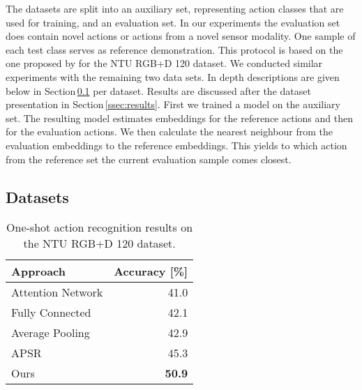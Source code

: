 \documentclass[10pt,conference,a4paper]{IEEEtran}
\def\secname{Section\,}
\def\ntuoneshotresult{50.9}
\begin{document}
The datasets are split into an auxiliary set, representing action classes that are used for training, and an evaluation set. In our experiments the evaluation set does contain novel actions or actions from a novel sensor modality. One sample of each test class serves as reference demonstration. This protocol is based on the one proposed by \cite{liu2019ntu} for the NTU RGB+D 120 dataset. We conducted similar experiments with the remaining two data sets. In depth descriptions are given below in \secname \ref{ssec:datasets} per dataset. Results are discussed after the dataset presentation in \secname \ref{ssec:results}.
First we trained a model on the auxiliary set. The resulting model estimates embeddings for the reference actions and then for the evaluation actions. We then calculate the nearest neighbour from the evaluation embeddings to the reference embeddings. This yields to which action from the reference set the current evaluation sample comes closest.

\subsection{Datasets}
\label{ssec:datasets}

\begin{table}[tb]
    \caption{One-shot action recognition results on the NTU RGB+D 120 dataset.}
	\begin{center}
        \small
		\begin{tabular}{lr}
Approach                                       &  Accuracy [\%]\\
            \toprule
            Attention Network \cite{liu2017global}       &  41.0                   \\ Fully Connected \cite{liu2017global}         &  42.1                   \\ Average Pooling \cite{liu2017skeleton}       &  42.9                   \\ APSR \cite{liu2019ntu}                       &  45.3          \\  Ours                                         & \textbf{\ntuoneshotresult}  \\ \bottomrule
		\end{tabular}
	\end{center}

	\label{tab:oneshot_results}
\end{table}
\end{document}
